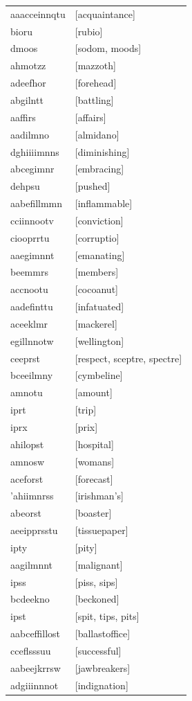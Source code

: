 \documentclass{article}
\begin{document}
\begin{tabular}{ll}
aaacceinnqtu & [acquaintance] \\
bioru & [rubio] \\
dmoos & [sodom, moods] \\
ahmotzz & [mazzoth] \\
adeefhor & [forehead] \\
abgilntt & [battling] \\
aaffirs & [affairs] \\
aadilmno & [almidano] \\
dghiiiimnns & [diminishing] \\
abcegimnr & [embracing] \\
dehpsu & [pushed] \\
aabefillmmn & [inflammable] \\
cciinnootv & [conviction] \\
ciooprrtu & [corruptio] \\
aaegimnnt & [emanating] \\
beemmrs & [members] \\
accnootu & [cocoanut] \\
aadefinttu & [infatuated] \\
aceeklmr & [mackerel] \\
egillnnotw & [wellington] \\
ceeprst & [respect, sceptre, spectre] \\
bceeilmny & [cymbeline] \\
amnotu & [amount] \\
iprt & [trip] \\
iprx & [prix] \\
ahilopst & [hospital] \\
amnosw & [womans] \\
aceforst & [forecast] \\
'ahiimnrss & [irishman's] \\
abeorst & [boaster] \\
aeeipprsstu & [tissuepaper] \\
ipty & [pity] \\
aagilmnnt & [malignant] \\
ipss & [piss, sips] \\
bcdeekno & [beckoned] \\
ipst & [spit, tips, pits] \\
aabceffillost & [ballastoffice] \\
cceflsssuu & [successful] \\
aabeejkrrsw & [jawbreakers] \\
adgiiinnnot & [indignation] \\

\end{tabular}
\end{document}
